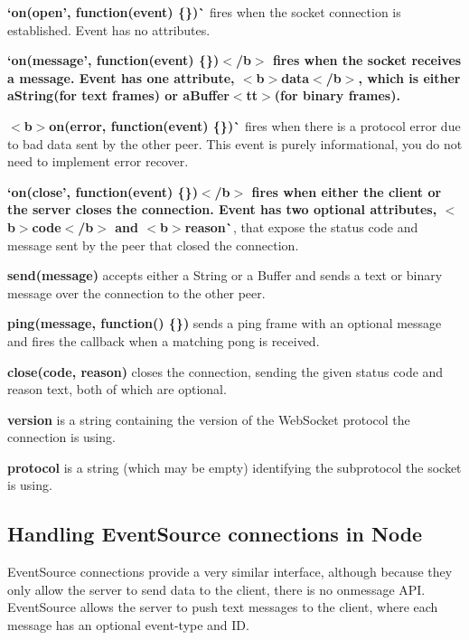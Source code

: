 \begin{DoxyItemize}
\item {\bfseries `on(\textquotesingle{}open', function(event) \{\})\`{}} fires when the socket connection is established. Event has no attributes.
\item {\bfseries `on(\textquotesingle{}message', function(event) \{\}){\ttfamily $<$/b$>$ fires when the socket receives a message. Event has one attribute, $<$b$>$}data{\ttfamily $<$/b$>$, which is either a}String{\ttfamily  (for text frames) or a}Buffer$<$tt$>$(for binary frames).}
\item {\bfseries $<$b$>$on(\textquotesingle{}error\textquotesingle{}, function(event) \{\})\`{}} fires when there is a protocol error due to bad data sent by the other peer. This event is purely informational, you do not need to implement error recover.
\item {\bfseries `on(\textquotesingle{}close', function(event) \{\}){\ttfamily $<$/b$>$ fires when either the client or the server closes the connection. Event has two optional attributes, $<$b$>$}code{\ttfamily $<$/b$>$ and $<$b$>$}reason\`{}}, that expose the status code and message sent by the peer that closed the connection.
\item {\bfseries {\ttfamily send(message)}} accepts either a {\ttfamily String} or a {\ttfamily Buffer} and sends a text or binary message over the connection to the other peer.
\item {\bfseries {\ttfamily ping(message, function() \{\})}} sends a ping frame with an optional message and fires the callback when a matching pong is received.
\item {\bfseries {\ttfamily close(code, reason)}} closes the connection, sending the given status code and reason text, both of which are optional.
\item {\bfseries {\ttfamily version}} is a string containing the version of the {\ttfamily Web\+Socket} protocol the connection is using.
\item {\bfseries {\ttfamily protocol}} is a string (which may be empty) identifying the subprotocol the socket is using.
\end{DoxyItemize}

\subsection*{Handling Event\+Source connections in Node}

Event\+Source connections provide a very similar interface, although because they only allow the server to send data to the client, there is no {\ttfamily onmessage} A\+PI. Event\+Source allows the server to push text messages to the client, where each message has an optional event-\/type and ID.


